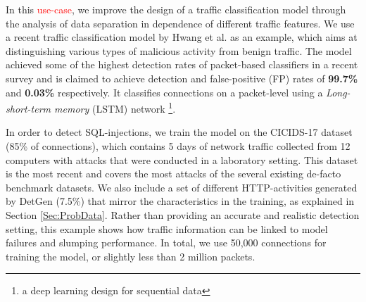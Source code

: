 \documentclass[runningheads]{llncs}
\begin{document}
In this \textcolor{red}{use-case}, we improve the design of a traffic classification model through the analysis of data separation in dependence of different traffic features. We use a recent traffic classification model by Hwang et al. \cite{hwang2019lstm} as an example, which aims at distinguishing various types of malicious activity from benign traffic. The model achieved some of the highest detection rates of packet-based classifiers in a recent survey \cite{tahaei2020rise} and is claimed to achieve detection and false-positive (FP) rates of \textbf{99.7\%} and \textbf{0.03\%} respectively.
It classifies connections on a packet-level using a \textit{Long-short-term memory} (LSTM) network \footnote{a deep learning design for sequential data}. 



In order to detect SQL-injections, we train the model on the CICIDS-17 dataset \cite{sharafaldin2018toward} (85\% of connections), which contains 5 days of network traffic collected from 12 computers with attacks that were conducted in a laboratory setting.
This dataset is the most recent and covers the most attacks of the several existing de-facto benchmark datasets. We also include a set of different HTTP-activities generated by DetGen (7.5\%) that mirror the characteristics in the training, as explained in Section \ref{Sec:ProbData}. Rather than providing an accurate and realistic detection setting, this example shows how traffic information can be linked to model failures and slumping performance. In total, we use 50,000 connections for training the model, or slightly less than 2 million packets.
\end{document}
